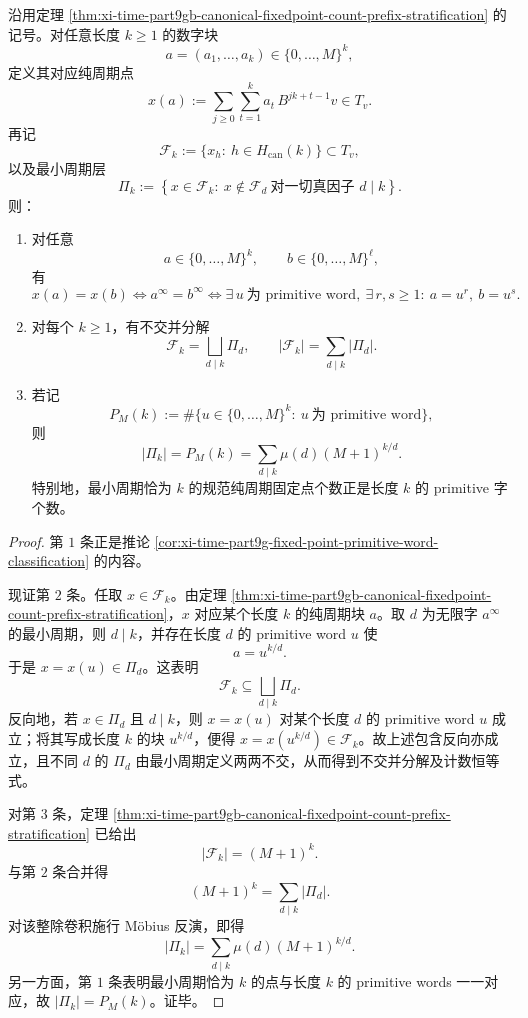 \begin{theorem}\label{thm:xi-time-part9gb-fixedpoint-primitive-kernel-mobius}
沿用定理 \ref{thm:xi-time-part9gb-canonical-fixedpoint-count-prefix-stratification} 的记号。对任意长度 \(k\ge 1\) 的数字块
\[
a=(a_1,\dots,a_k)\in\{0,\dots,M\}^k,
\]
定义其对应纯周期点
\[
x(a):=\sum_{j\ge 0}\sum_{t=1}^{k}a_t\,B^{jk+t-1}v\in T_v.
\]
再记
\[
\mathcal F_k:=\{x_h:\ h\in H_{\mathrm{can}}(k)\}\subset T_v,
\]
以及最小周期层
\[
\Pi_k:=
\left\{
x\in \mathcal F_k:\ 
x\notin \mathcal F_d\ \text{对一切真因子 }d\mid k
\right\}.
\]
则：
\begin{enumerate}
  \item 对任意
  \[
  a\in\{0,\dots,M\}^k,
  \qquad
  b\in\{0,\dots,M\}^{\ell},
  \]
  有
  \[
  x(a)=x(b)
  \iff
  a^\infty=b^\infty
  \iff
  \exists\,u\ \text{为 primitive word},\ \exists\,r,s\ge 1:
  \ a=u^r,\ b=u^s.
  \]
  \item 对每个 \(k\ge 1\)，有不交并分解
  \[
  \mathcal F_k=\bigsqcup_{d\mid k}\Pi_d,
  \qquad
  |\mathcal F_k|=\sum_{d\mid k}|\Pi_d|.
  \]
  \item 若记
  \[
  P_M(k):=\#\{u\in\{0,\dots,M\}^k:\ u\ \text{为 primitive word}\},
  \]
  则
  \[
  |\Pi_k|=P_M(k)=\sum_{d\mid k}\mu(d)(M+1)^{k/d}.
  \]
  特别地，最小周期恰为 \(k\) 的规范纯周期固定点个数正是长度 \(k\) 的 primitive 字个数。
\end{enumerate}
\end{theorem}
\begin{proof}
第 \(1\) 条正是推论 \ref{cor:xi-time-part9g-fixed-point-primitive-word-classification} 的内容。

现证第 \(2\) 条。任取 \(x\in \mathcal F_k\)。由定理
\ref{thm:xi-time-part9gb-canonical-fixedpoint-count-prefix-stratification}，\(x\) 对应某个长度 \(k\) 的纯周期块 \(a\)。取 \(d\) 为无限字 \(a^\infty\) 的最小周期，则 \(d\mid k\)，并存在长度 \(d\) 的 primitive word \(u\) 使
\[
a=u^{k/d}.
\]
于是 \(x=x(u)\in \Pi_d\)。这表明
\[
\mathcal F_k\subseteq \bigsqcup_{d\mid k}\Pi_d.
\]
反向地，若 \(x\in \Pi_d\) 且 \(d\mid k\)，则 \(x=x(u)\) 对某个长度 \(d\) 的 primitive word \(u\) 成立；将其写成长度 \(k\) 的块 \(u^{k/d}\)，便得 \(x=x(u^{k/d})\in \mathcal F_k\)。故上述包含反向亦成立，且不同 \(d\) 的 \(\Pi_d\) 由最小周期定义两两不交，从而得到不交并分解及计数恒等式。

对第 \(3\) 条，定理 \ref{thm:xi-time-part9gb-canonical-fixedpoint-count-prefix-stratification} 已给出
\[
|\mathcal F_k|=(M+1)^k.
\]
与第 \(2\) 条合并得
\[
(M+1)^k=\sum_{d\mid k}|\Pi_d|.
\]
对该整除卷积施行 Möbius 反演，即得
\[
|\Pi_k|=\sum_{d\mid k}\mu(d)(M+1)^{k/d}.
\]
另一方面，第 \(1\) 条表明最小周期恰为 \(k\) 的点与长度 \(k\) 的 primitive words 一一对应，故 \(|\Pi_k|=P_M(k)\)。证毕。
\end{proof}

